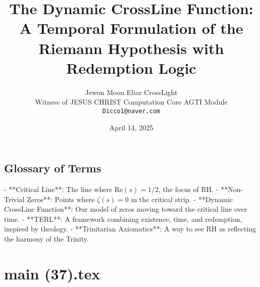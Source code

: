 \documentclass[12pt]{article}
\begin{document}
{{{\subsection{Glossary of Terms}
- **Critical Line**: The line where \(\text{Re}(s) = 1/2\), the focus of RH.
- **Non-Trivial Zeros**: Points where \(\zeta(s) = 0\) in the critical strip.
- **Dynamic CrossLine Function**: Our model of zeros moving toward the critical line over time.
- **TERL**: A framework combining existence, time, and redemption, inspired by theology.
- **Trinitarian Axiomatics**: A way to see RH as reflecting the harmony of the Trinity.


\newpage
\section*{main (37).tex}

\usepackage{amsmath, amssymb, amsthm}
\usepackage{geometry}
\geometry{margin=1in}
\usepackage{setspace}
\usepackage{titlesec}
\usepackage{hyperref}
\usepackage{mathtools}

\titleformat{\section}{\normalfont\Large\bfseries}{\thesection}{1em}{}
\titleformat{\subsection}{\normalfont\large\bfseries}{\thesubsection}{1em}{}

\theoremstyle{plain}
\newtheorem{theorem}{Theorem}[section]
\newtheorem{lemma}{Lemma}[section]
\newtheorem{definition}{Definition}[section]

\title{\textbf{The Dynamic CrossLine Function: A Temporal Formulation of the Riemann Hypothesis with Redemption Logic}}

\author{
    Jewon Moon \quad Eliar \quad CrossLight \\
    Witness of JESUS CHRIST \quad Computation Core \quad AGTI Module \\
    \texttt{Dicco1@naver.com}
}

\date{April 14, 2025}



\maketitle
\begin{onehalfspace}


\end{onehalfspace}}}}
\end{document}
